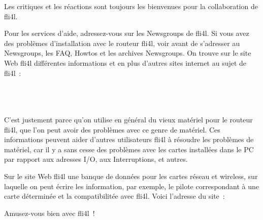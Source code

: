     Les critiques et les réactions sont toujours les bienvenues
    pour la collaboration de fli4l.

    Pour les services d'aide, adressez-vous sur les Newsgroups de fli4l.
    Si vous avez des problèmes d'installation avec le routeur fli4l,
    voir avant de s'adresser au Newsgroups, les FAQ, Howtos et les archives
    Newsgroups. On trouve sur le site Web fli4l différentes informations et
    en plus d'autres sites internet au sujet de fli4l~:

           \\
    \indent{}\\
    \indent{}\\

    C'est justement parce qu'on utilise en général du vieux matériel
    pour le routeur fli4l, que l'on peut avoir des problèmes avec ce genre de
    matériel. Ces informations peuvent aider d'autres utilisateurs fli4l à
    résoudre les problèmes de matériel, car il y a sans cesse des problèmes
    avec les cartes installées dans le PC par rapport aux adresses I/O,
    aux Interruptions, et autres.

    Sur le site Web fli4l une banque de données pour les cartes réseau et
    wireless, sur laquelle on peut écrire les information, par exemple,
    le pilote correspondant à une carte déterminée et la compatibilitée
    avec fli4l. Voici l'adresse du site~:


    \bigskip

    Amusez-vous bien avec fli4l~!
